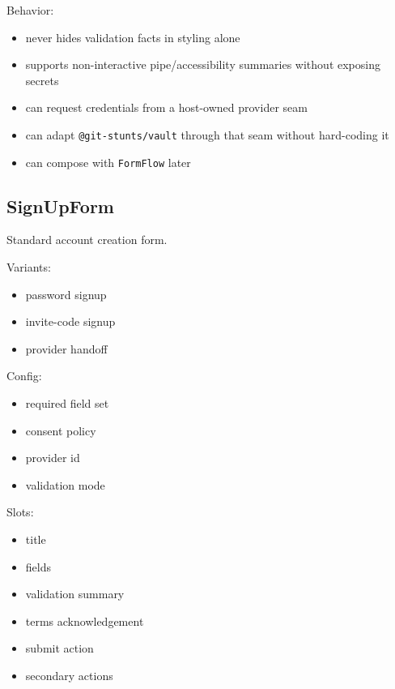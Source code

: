 Behavior:

\begin{itemize}
\tightlist
\item
  never hides validation facts in styling alone
\item
  supports non-interactive pipe/accessibility summaries without exposing secrets
\item
  can request credentials from a host-owned provider seam
\item
  can adapt \texttt{@\allowbreak{}g\allowbreak{}i\allowbreak{}t\allowbreak{}-\allowbreak{}s\allowbreak{}t\allowbreak{}u\allowbreak{}n\allowbreak{}t\allowbreak{}s\allowbreak{}/\allowbreak{}v\allowbreak{}a\allowbreak{}u\allowbreak{}l\allowbreak{}t} through that seam without hard-coding it
\item
  can compose with \texttt{F\allowbreak{}o\allowbreak{}r\allowbreak{}m\allowbreak{}F\allowbreak{}l\allowbreak{}o\allowbreak{}w} later
\end{itemize}

\subsection{SignUpForm}\label{record-128-signupform}

Standard account creation form.

Variants:

\begin{itemize}
\tightlist
\item
  password signup
\item
  invite-code signup
\item
  provider handoff
\end{itemize}

Config:

\begin{itemize}
\tightlist
\item
  required field set
\item
  consent policy
\item
  provider id
\item
  validation mode
\end{itemize}

Slots:

\begin{itemize}
\tightlist
\item
  title
\item
  fields
\item
  validation summary
\item
  terms acknowledgement
\item
  submit action
\item
  secondary actions
\end{itemize}

